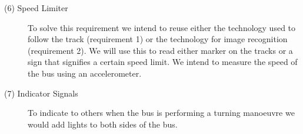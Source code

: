 \begin{description}
    \item[(6) Speed Limiter]
    To solve this requirement we intend to reuse either the technology used to follow the track (requirement 1) or the technology for image recognition (requirement 2). We will use this to read either marker on the tracks or a sign that signifies a certain speed limit. We intend to measure the speed of the bus using an accelerometer. 
    

    \item[(7) Indicator Signals]
    To indicate to others when the bus is performing a turning manoeuvre we would add lights to both sides of the bus.
    
    
\end{description}


